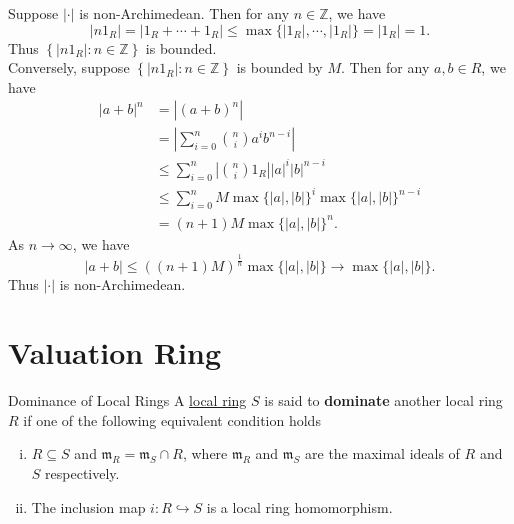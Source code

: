 \begin{prf}
    Suppose $|\cdot|$ is non-Archimedean. Then for any $n\in\mathbb{Z}$, we have
    \[
        |n1_R|=|1_R+\cdots+1_R|\le \max\{|1_R|,\cdots,|1_R|\}=|1_R|=1.
    \]
    Thus $\left\{ |n1_R|:n\in \mathbb{Z}\right\}$ is bounded.\\
    Conversely, suppose $\left\{ |n1_R|:n\in \mathbb{Z}\right\}$ is bounded by $M$. Then for any $a,b\in R$, we have 
    \begin{align*}
        |a+b|^n&=|(a+b)^n|\\
        &=\left| \sum_{i=0}^n\binom{n}{i}a^ib^{n-i}\right|\\
        &\le \sum_{i=0}^n\left|\binom{n}{i}1_R\right||a|^i|b|^{n-i}\\
        &\le \sum_{i=0}^n M\max\{|a|,|b|\}^i\max\{|a|,|b|\}^{n-i}\\
        &=(n+1) M \max\{|a|,|b|\}^n.
    \end{align*}
    As $n\to \infty$, we have
    \[
        |a+b|\le \left((n+1) M \right)^{\frac{1}{n}}\max\{|a|,|b|\}\to \max\{|a|,|b|\}.
        \]
    Thus $|\cdot|$ is non-Archimedean.
\end{prf}



\section{Valuation Ring}

\begin{definition}{Dominance of Local Rings}{}
    A \hyperref[th:local_commutative_ring]{local ring} $S$ is said to \textbf{dominate} another local ring $R$ if one of the following equivalent condition holds
    \begin{enumerate}[(i)]
        \item $R\subseteq S$ and $\mathfrak{m}_R=\mathfrak{m}_S\cap R$, where $\mathfrak{m}_R$ and $\mathfrak{m}_S$ are the maximal ideals of $R$ and $S$ respectively.
        \item The inclusion map $i:R\hookrightarrow S$ is a local ring homomorphism.
    \end{enumerate}
  
\end{definition}

